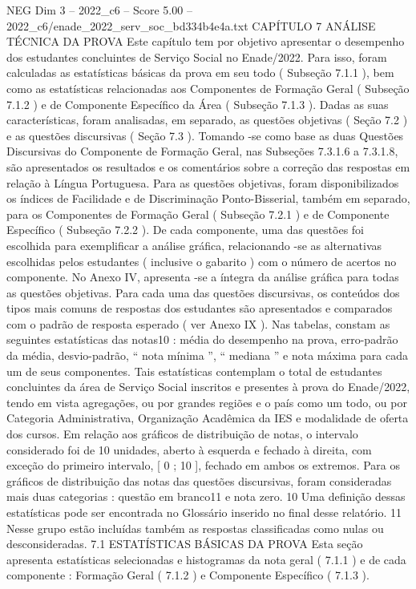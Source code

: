 \begin{textsample}{NEG Dim 3 – 2022\_c6 – Score 5.00 – 2022\_c6/enade\_2022\_serv\_soc\_bd334b4e4a.txt}  \label{ex:f3_neg_261}
CAPÍTULO 7 ANÁLISE TÉCNICA DA PROVA Este capítulo tem por objetivo apresentar o desempenho dos estudantes concluintes de Serviço Social no Enade/2022.
Para isso, foram calculadas as estatísticas básicas da prova em seu todo ( Subseção 7.1.1 ), bem como as estatísticas relacionadas aos Componentes de Formação Geral ( Subseção 7.1.2 ) e de Componente Específico da Área ( Subseção 7.1.3 ).
Dadas as suas características, foram analisadas, em separado, as questões objetivas ( Seção 7.2 ) e as questões discursivas ( Seção 7.3 ).
Tomando -se como base as duas Questões Discursivas do Componente de Formação Geral, nas Subseções 7.3.1.6 a 7.3.1.8, são apresentados os resultados e os comentários sobre a correção das respostas em relação à Língua Portuguesa.
Para as questões objetivas, foram disponibilizados os índices de Facilidade e de Discriminação Ponto-Bisserial, também em separado, para os Componentes de Formação Geral ( Subseção 7.2.1 ) e de Componente Específico ( Subseção 7.2.2 ).
De cada componente, uma das questões foi escolhida para exemplificar a análise gráfica, relacionando -se as alternativas escolhidas pelos estudantes ( inclusive o gabarito ) com o número de acertos no componente.
No Anexo IV, apresenta -se a íntegra da análise gráfica para todas as questões objetivas.
Para cada uma das questões discursivas, os conteúdos dos tipos mais comuns de respostas dos estudantes são apresentados e comparados com o padrão de resposta esperado ( ver Anexo IX ).
Nas tabelas, constam as seguintes estatísticas das notas10 : média do desempenho na prova, erro-padrão da média, desvio-padrão, “ nota mínima ”, “ mediana ” e nota máxima para cada um de seus componentes.
Tais estatísticas contemplam o total de estudantes concluintes da área de Serviço Social inscritos e presentes à prova do Enade/2022, tendo em vista agregações, ou por grandes regiões e o país como um todo, ou por Categoria Administrativa, Organização Acadêmica da IES e modalidade de oferta dos cursos.
Em relação aos gráficos de distribuição de notas, o intervalo considerado foi de 10 unidades, aberto à esquerda e fechado à direita, com exceção do primeiro intervalo, [ 0 ; 10 ], fechado em ambos os extremos.
Para os gráficos de distribuição das notas das questões discursivas, foram consideradas mais duas categorias : questão em branco11 e nota zero. 10 Uma definição dessas estatísticas pode ser encontrada no Glossário inserido no final desse relatório. 11 Nesse grupo estão incluídas também as respostas classificadas como nulas ou desconsideradas. 7.1 ESTATÍSTICAS BÁSICAS DA PROVA Esta seção apresenta estatísticas selecionadas e histogramas da nota geral ( 7.1.1 ) e de cada componente : Formação Geral ( 7.1.2 ) e Componente Específico ( 7.1.3 ).

\end{textsample}
